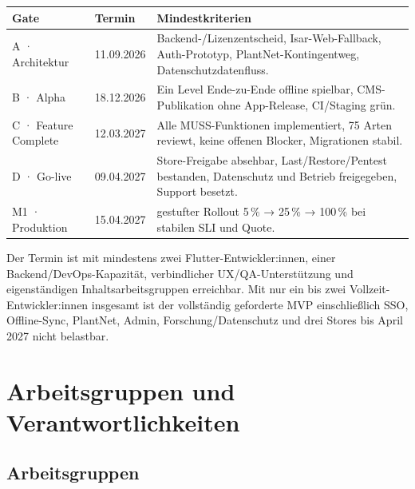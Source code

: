 \documentclass[10pt,a4paper,oneside]{article}
\begin{document}
\begin{tabularx}{\textwidth}{@{}p{23mm}p{32mm}X@{}}
\toprule
\textbf{Gate} & \textbf{Termin} & \textbf{Mindestkriterien} \\
\midrule
A · Architektur & 11.09.2026 & Backend-/Lizenzentscheid, Isar-Web-Fallback, Auth-Prototyp, PlantNet-Kontingentweg, Datenschutzdatenfluss. \\
B · Alpha & 18.12.2026 & Ein Level Ende-zu-Ende offline spielbar, CMS-Publikation ohne App-Release, CI/Staging grün. \\
C · Feature Complete & 12.03.2027 & Alle MUSS-Funktionen implementiert, 75 Arten reviewt, keine offenen Blocker, Migrationen stabil. \\
D · Go-live & 09.04.2027 & Store-Freigabe absehbar, Last/Restore/Pentest bestanden, Datenschutz und Betrieb freigegeben, Support besetzt. \\
M1 · Produktion & 15.04.2027 & gestufter Rollout 5\,\% → 25\,\% → 100\,\% bei stabilen SLI und Quote. \\
\bottomrule
\end{tabularx}

\begin{riskbox}[title={\textbf{Terminrealismus}}]
Der Termin ist mit mindestens zwei Flutter-Entwickler:innen, einer Backend/DevOps-Kapazität, verbindlicher UX/QA-Unterstützung und eigenständigen Inhaltsarbeitsgruppen erreichbar. Mit nur ein bis zwei Vollzeit-Entwickler:innen insgesamt ist der vollständig geforderte MVP einschließlich SSO, Offline-Sync, PlantNet, Admin, Forschung/Datenschutz und drei Stores bis April 2027 nicht belastbar.
\end{riskbox}

\section{Arbeitsgruppen und Verantwortlichkeiten}

\subsection{Arbeitsgruppen}
\end{document}

